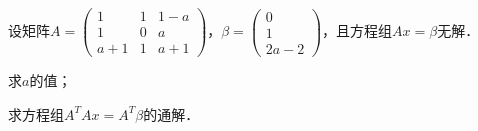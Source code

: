 \documentclass[plain,noanswer,medmath]{../../template/jnuexam}
\begin{document}
\begin{problem}[points=11]
设矩阵$A = \begin{pmatrix}
      1 & 1 & 1 - a \\
      1 & 0 & a \\
  a + 1 & 1 & a + 1
\end{pmatrix}$，$\beta = \begin{pmatrix}
  0 \\
  1 \\
  2a - 2
\end{pmatrix}$，且方程组$Ax = \beta$无解．\par
\begin{enumerate*}
\item 求$a$的值；
\item 求方程组$A^T Ax = A^T\beta$的通解．
\end{enumerate*}
\end{problem}


\end{document}
